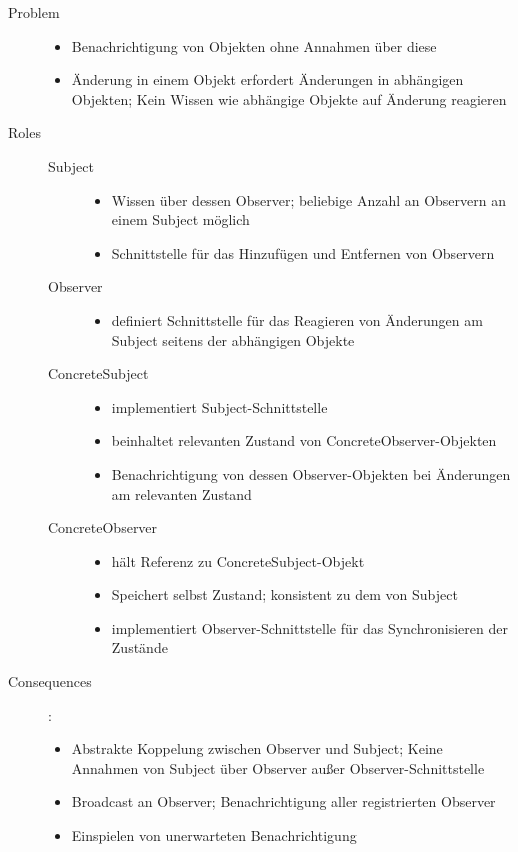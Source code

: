 \begin{description}
    \item[Problem] \hfill 
    \begin{itemize}
        \item Benachrichtigung von Objekten ohne Annahmen über diese
        \item Änderung in einem Objekt erfordert Änderungen in abhängigen Objekten; Kein Wissen wie abhängige Objekte auf Änderung reagieren
    \end{itemize}
    \item[Roles] \hfill
    \begin{description}
        \item[Subject] \hfill 
        \begin{itemize}
            \item Wissen über dessen Observer; beliebige Anzahl an Observern an einem Subject möglich
            \item Schnittstelle für das Hinzufügen und Entfernen von Observern
        \end{itemize}
        \item[Observer] \hfill 
        \begin{itemize}
            \item definiert Schnittstelle für das Reagieren von Änderungen am Subject seitens der abhängigen Objekte
        \end{itemize}
        \item[ConcreteSubject] \hfill 
        \begin{itemize}
            \item implementiert Subject-Schnittstelle
            \item beinhaltet relevanten Zustand von ConcreteObserver-Objekten
            \item Benachrichtigung von dessen Observer-Objekten bei Änderungen am relevanten Zustand
        \end{itemize}
        \item[ConcreteObserver] \hfill 
        \begin{itemize}
            \item hält Referenz zu ConcreteSubject-Objekt
            \item Speichert selbst Zustand; konsistent zu dem von Subject
            \item implementiert Observer-Schnittstelle für das Synchronisieren der Zustände  
        \end{itemize}
    \end{description}
    \item[Consequences]:
    \begin{itemize}
        \item Abstrakte Koppelung zwischen Observer und Subject; Keine Annahmen von Subject über Observer außer Observer-Schnittstelle
        \item Broadcast an Observer; Benachrichtigung aller registrierten Observer
        \item Einspielen von unerwarteten Benachrichtigung 
    \end{itemize}
\end{description}